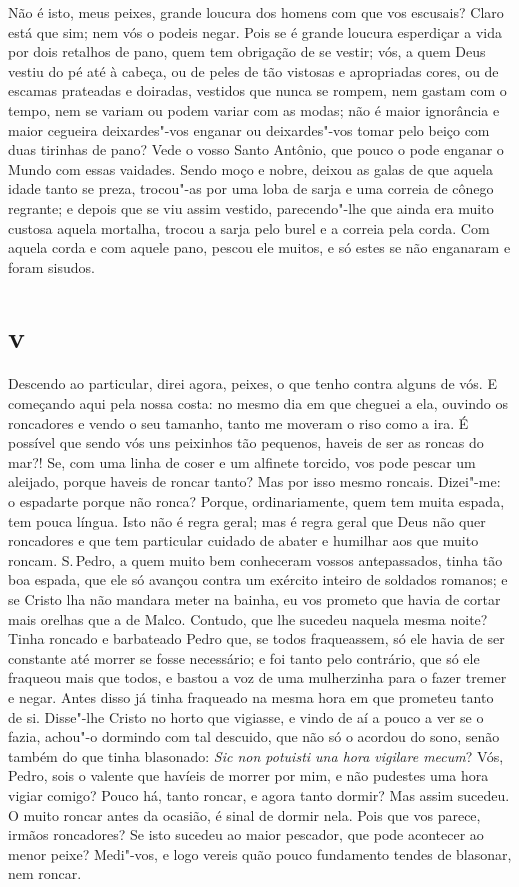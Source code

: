 Não é isto, meus peixes, grande loucura dos homens com que vos escusais?
Claro está que sim; nem vós o podeis negar. Pois se é grande loucura
esperdiçar a vida por dois retalhos de pano, quem tem obrigação de se
vestir; vós, a quem Deus vestiu do pé até à cabeça, ou de peles de tão
vistosas e apropriadas cores, ou de escamas prateadas e doiradas,
vestidos que nunca se rompem, nem gastam com o tempo, nem se variam ou
podem variar com as modas; não é maior ignorância e maior cegueira
deixardes"-vos enganar ou deixardes"-vos tomar pelo beiço com duas
tirinhas de pano? Vede o vosso Santo Antônio, que pouco o pode enganar o
Mundo com essas vaidades. Sendo moço e nobre, deixou as galas de que
aquela idade tanto se preza, trocou"-as por uma loba de sarja e uma
correia de cônego regrante; e depois que se viu assim vestido,
parecendo"-lhe que ainda era muito custosa aquela mortalha, trocou a
sarja pelo burel e a correia pela corda. Com aquela corda e com aquele
pano, pescou ele muitos, e só estes se não enganaram e foram sisudos.

\section{v}

Descendo ao particular, direi agora, peixes, o que tenho contra alguns
de vós. E começando aqui pela nossa costa: no mesmo dia em que cheguei a
ela, ouvindo os roncadores e vendo o seu tamanho, tanto me moveram o
riso como a ira. É possível que sendo vós uns peixinhos tão pequenos,
haveis de ser as roncas do mar?! Se, com uma linha de coser e um
alfinete torcido, vos pode pescar um aleijado, porque haveis de roncar
tanto? Mas por isso mesmo roncais. Dizei"-me: o espadarte porque não
ronca? Porque, ordinariamente, quem tem muita espada, tem pouca língua.
Isto não é regra geral; mas é regra geral que Deus não quer roncadores e
que tem particular cuidado de abater e humilhar aos que muito roncam.
S.\,Pedro, a quem muito bem conheceram vossos antepassados, tinha tão boa
espada, que ele só avançou contra um exército inteiro de soldados
romanos; e se Cristo lha não mandara meter na bainha, eu vos prometo que
havia de cortar mais orelhas que a de Malco. Contudo, que lhe sucedeu
naquela mesma noite? Tinha roncado e barbateado Pedro que, se todos
fraqueassem, só ele havia de ser constante até morrer se fosse
necessário; e foi tanto pelo contrário, que só ele fraqueou mais que
todos, e bastou a voz de uma mulherzinha para o fazer tremer e negar.
Antes disso já tinha fraqueado na mesma hora em que prometeu tanto de
si. Disse"-lhe Cristo no horto que vigiasse, e vindo de aí a pouco a ver
se o fazia, achou"-o dormindo com tal descuido, que não só o acordou do
sono, senão também do que tinha blasonado: \emph{Sic non potuisti una
hora vigilare mecum}? Vós, Pedro, sois o valente que havíeis de morrer
por mim, e não pudestes uma hora vigiar comigo? Pouco há, tanto
roncar, e agora tanto dormir? Mas assim sucedeu. O muito roncar antes da
ocasião, é sinal de dormir nela. Pois que vos parece, irmãos roncadores?
Se isto sucedeu ao maior pescador, que pode acontecer ao menor peixe?
Medi"-vos, e logo vereis quão pouco fundamento tendes de blasonar, nem
roncar.

